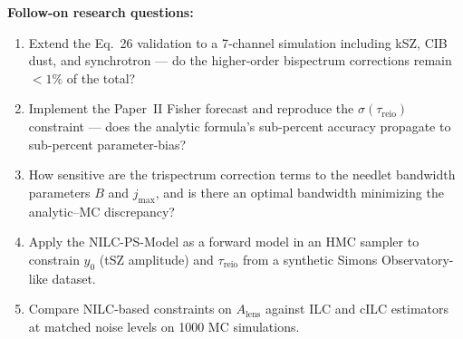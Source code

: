 \documentclass[11pt]{article}
\begin{document}
\noindent\textbf{Follow-on research questions:}
\begin{enumerate}[leftmargin=1.6em,itemsep=0.2em,topsep=0.2em,label=Q\arabic*.]
\item Extend the Eq.~26 validation to a 7-channel simulation including kSZ, CIB dust, and synchrotron --- do the higher-order bispectrum corrections remain $<1\%$ of the total?
\item Implement the Paper~II Fisher forecast and reproduce the $\sigma(\tau_\mathrm{reio})$ constraint --- does the analytic formula's sub-percent accuracy propagate to sub-percent parameter-bias?
\item How sensitive are the trispectrum correction terms to the needlet bandwidth parameters $B$ and $j_\mathrm{max}$, and is there an optimal bandwidth minimizing the analytic--MC discrepancy?
\item Apply the NILC-PS-Model as a forward model in an HMC sampler to constrain $y_0$ (tSZ amplitude) and $\tau_\mathrm{reio}$ from a synthetic Simons Observatory-like dataset.
\item Compare NILC-based constraints on $A_\mathrm{lens}$ against ILC and cILC estimators at matched noise levels on 1000 MC simulations.
\end{enumerate}
\end{document}
